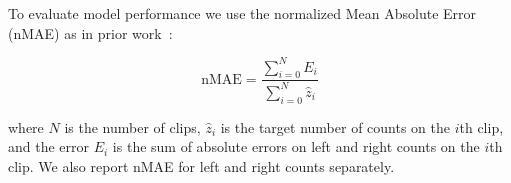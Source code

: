 To evaluate model performance we use the normalized Mean Absolute Error (nMAE) as in prior work~\cite{kay2022caltechfishcountingdataset}:

\vspace{-5pt}
\begin{equation}
    \text{nMAE}=\frac{\sum_{i=0}^{N} E_i}{\sum_{i=0}^{N}\hat{z}_i}
\end{equation}

\noindent
where $N$ is the number of clips, $\hat{z}_i$ is the target number of counts on the $i$th clip, and the error $E_i$ is the sum of absolute errors on left and right counts on the $i$th clip.
We also report nMAE for left and right counts separately. 



